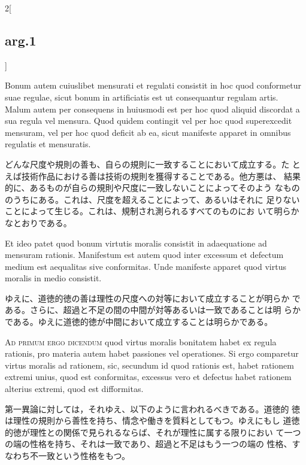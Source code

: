 \documentclass[paper=a4paper,fontsize=10pt,jafontsize=9pt,titlepage]{jlreq}
\begin{document}
\begin{paracol}{2}[\subsection{arg.1}]
\switchcolumn*

Bonum autem cuiuslibet mensurati et regulati consistit in hoc quod
 conformetur suae regulae, sicut bonum in artificiatis est ut
 consequantur regulam artis. Malum autem per consequens in huiusmodi
 est per hoc quod aliquid discordat a sua regula vel mensura. Quod
 quidem contingit vel per hoc quod superexcedit mensuram, vel per hoc
 quod deficit ab ea, sicut manifeste apparet in omnibus regulatis et
 mensuratis.

\switchcolumn

どんな尺度や規則の善も、自らの規則に一致することにおいて成立する。た
 とえば技術作品における善は技術の規則を獲得することである。他方悪は、
 結果的に、あるものが自らの規則や尺度に一致しないことによってそのよう
 なもののうちにある。これは、尺度を超えることによって、あるいはそれに
 足りないことによって生じる。これは、規制され測られるすべてのものにお
 いて明らかなとおりである。

\switchcolumn*

Et ideo patet quod bonum virtutis moralis consistit in adaequatione
 ad mensuram rationis. Manifestum est autem quod inter excessum et
 defectum medium est aequalitas sive conformitas. Unde manifeste
 apparet quod virtus moralis in medio consistit.

\switchcolumn

ゆえに、道徳的徳の善は理性の尺度への対等において成立することが明らか
 である。さらに、超過と不足の間の中間が対等あるいは一致であることは明
 らかである。ゆえに道徳的徳が中間において成立することは明らかである。

\switchcolumn*[\subsection{ad.1}]

{\scshape Ad primum ergo dicendum} quod virtus moralis bonitatem habet
ex regula rationis, pro materia autem habet passiones vel
operationes. Si ergo comparetur virtus moralis ad rationem, sic,
secundum id quod rationis est, habet rationem extremi unius, quod est
conformitas, excessus vero et defectus habet rationem alterius
extremi, quod est difformitas.

\switchcolumn

第一異論に対しては，それゆえ、以下のように言われるべきである。道徳的
 徳は理性の規則から善性を持ち、情念や働きを質料としてもつ。ゆえにもし
 道徳的徳が理性との関係で見られるならば、それが理性に属する限りにおい
 て一つの端の性格を持ち、それは一致であり、超過と不足はもう一つの端の
 性格、すなわち不一致という性格をもつ。


\end{paracol}
\end{document}
